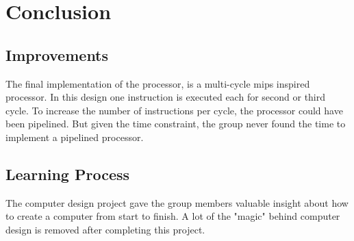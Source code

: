 \chapter{Conclusion}

\section{Improvements}
The final implementation of the processor, is a multi-cycle mips inspired processor.
In this design one instruction is executed each for second or third cycle.
To increase the number of instructions per cycle, the processor could have been pipelined.
But given the time constraint, the group never found the time to implement a pipelined processor.

\section{Learning Process}
The computer design project gave the group members valuable insight about how to create a computer from start to finish.
A lot of the "magic" behind computer design is removed after completing this project.
